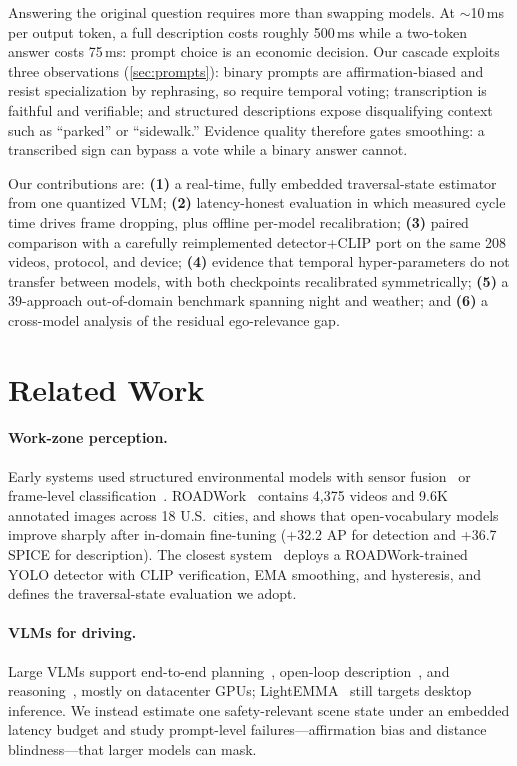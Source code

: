 \documentclass[10pt,twocolumn,letterpaper]{article}
\begin{document}
Answering the original question requires more than swapping models.  At $\sim$10\,ms per output token, a full description costs roughly 500\,ms while a two-token answer costs 75\,ms: prompt choice is an economic decision.  Our cascade exploits three observations (\cref{sec:prompts}): binary prompts are affirmation-biased and resist specialization by rephrasing, so require temporal voting; transcription is faithful and verifiable; and structured descriptions expose disqualifying context such as ``parked'' or ``sidewalk.''  Evidence quality therefore gates smoothing: a transcribed sign can bypass a vote while a binary answer cannot.

Our contributions are: \textbf{(1)} a real-time, fully embedded traversal-state estimator from one quantized VLM; \textbf{(2)} latency-honest evaluation in which measured cycle time drives frame dropping, plus offline per-model recalibration; \textbf{(3)} paired comparison with a carefully reimplemented detector+CLIP port on the same 208 videos, protocol, and device; \textbf{(4)} evidence that temporal hyper-parameters do not transfer between models, with both checkpoints recalibrated symmetrically; \textbf{(5)} a 39-approach out-of-domain benchmark spanning night and weather; and \textbf{(6)} a cross-model analysis of the residual ego-relevance gap.

\section{Related Work}
\label{sec:related}

\paragraph{Work-zone perception.} Early systems used structured environmental models with sensor fusion~\cite{shi2021workzone} or frame-level classification~\cite{abodo2018shrp}.  ROADWork~\cite{ghosh2025roadwork} contains 4{,}375 videos and 9.6K annotated images across 18 U.S.\ cities, and shows that open-vocabulary models improve sharply after in-domain fine-tuning (+32.2 AP for detection and +36.7 SPICE for description).  The closest system~\cite{priorsystem2026} deploys a ROADWork-trained YOLO detector with CLIP verification, EMA smoothing, and hysteresis, and defines the traversal-state evaluation we adopt.

\paragraph{VLMs for driving.} Large VLMs support end-to-end planning~\cite{hwang2024emma,tian2024drivevlm}, open-loop description~\cite{marcu2024lingoqa}, and reasoning~\cite{nvidia2025cosmosreason}, mostly on datacenter GPUs; LightEMMA~\cite{lightemma2025} still targets desktop inference.  We instead estimate one safety-relevant scene state under an embedded latency budget and study prompt-level failures---affirmation bias and distance blindness---that larger models can mask.
\end{document}

